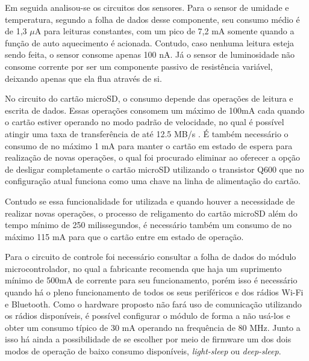Em seguida analisou-se os circuitos dos sensores. Para o sensor de umidade e temperatura, segundo a folha de dados desse componente, seu consumo médio é de 1,3 $\mu$A para leituras constantes, com um pico de 7,2 mA somente quando a função de auto aquecimento é acionada. Contudo, caso nenhuma leitura esteja sendo feita, o sensor consome apenas 100 nA. Já o sensor de luminosidade não consome corrente por ser um componente passivo de resistência variável, deixando apenas que ela flua através de si.

No circuito do cartão microSD, o consumo depende das operações de leitura e escrita de dados. Essas operações consomem um máximo de 100mA cada quando o cartão estiver operando no modo padrão de velocidade, no qual é possível atingir uma taxa de transferência de até 12.5 MB/s \cite{2010sd3sd}. É também necessário o consumo de no máximo 1 mA para manter o cartão em estado de espera para realização de novas operações, o qual foi procurado eliminar ao oferecer a opção de desligar completamente o cartão microSD utilizando o transistor Q600 que no configuração atual funciona como uma chave na linha de alimentação do cartão.

Contudo se essa funcionalidade for utilizada e quando houver a necessidade de realizar novas operações, o processo de religamento do cartão microSD além do tempo mínimo de 250 milissegundos, é necessário também um consumo de no máximo 115 mA para que o cartão entre em estado de operação. 

Para o circuito de controle foi necessário consultar a folha de dados do módulo microcontrolador, no qual a fabricante recomenda que haja um suprimento mínimo de 500mA de corrente para seu funcionamento, porém isso é necessário quando há o pleno funcionamento de todos os seus periféricos e dos rádios Wi-Fi e Bluetooth. Como o hardware proposto não fará uso de comunicação utilizando os rádios disponíveis, é possível configurar o módulo de forma a não usá-los e obter um consumo típico de 30 mA operando na frequência de 80 MHz. Junto a isso há ainda a possibilidade de se escolher por meio de firmware um dos dois modos de operação de baixo consumo disponíveis, \textit{light-sleep} ou \textit{deep-sleep}. 

